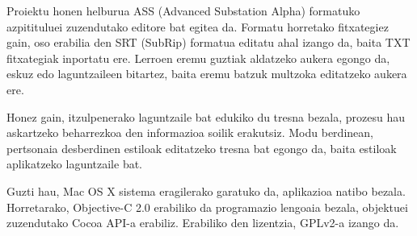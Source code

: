 
\thispagestyle{empty}
Proiektu honen helburua ASS (Advanced Substation Alpha) formatuko azpitituluei zuzendutako editore bat egitea da. Formatu horretako fitxategiez gain, oso erabilia den SRT (SubRip) formatua editatu ahal izango da, baita TXT fitxategiak inportatu ere. Lerroen eremu guztiak aldatzeko aukera egongo da, eskuz edo laguntzaileen bitartez, baita eremu batzuk multzoka editatzeko aukera ere.

Honez gain, itzulpenerako laguntzaile bat edukiko du tresna bezala, prozesu hau askartzeko beharrezkoa den informazioa soilik erakutsiz. Modu berdinean, pertsonaia desberdinen estiloak editatzeko tresna bat egongo da, baita estiloak aplikatzeko laguntzaile bat.

Guzti hau, Mac OS X sistema eragilerako garatuko da, aplikazioa natibo bezala. Horretarako, Objective-C 2.0 erabiliko da programazio lengoaia bezala, objektuei zuzendutako Cocoa API-a erabiliz. Erabiliko den lizentzia, GPLv2-a izango da.

\clearpage                         %
\thispagestyle{empty} \ \clearpage %
